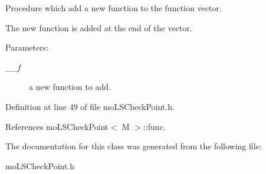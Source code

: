 Procedure which add a new function to the function vector. 

The new function is added at the end of the vector. \begin{Desc}
\item[Parameters:]
\begin{description}
\item[{\em \_\-\_\-f}]a new function to add. \end{description}
\end{Desc}


Definition at line 49 of file mo\-LSCheck\-Point.h.

References mo\-LSCheck\-Point$<$ M $>$::func.

The documentation for this class was generated from the following file:\begin{CompactItemize}
\item 
mo\-LSCheck\-Point.h\end{CompactItemize}
